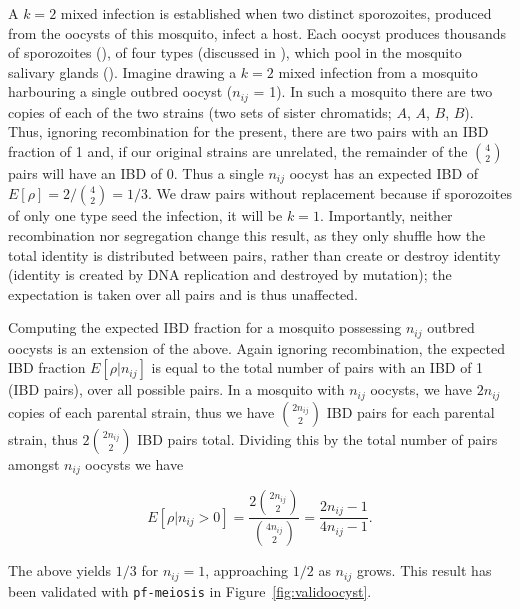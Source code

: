 \documentclass[9pt]{article}
\begin{document}
A $k=2$ mixed infection is established when two distinct sporozoites, produced from the oocysts of this mosquito, infect a host. Each oocyst produces thousands of sporozoites (\citet{Beir1991}), of four types (discussed in \citet{McKenzie2001}), which pool in the mosquito salivary glands (\citet{Gosh2000}). Imagine drawing a $k=2$ mixed infection from a mosquito harbouring a single outbred oocyst ($n_{ij}$ = 1). In such a mosquito there are two copies of each of the two strains (two sets of sister chromatids; $A$, $A$, $B$, $B$). Thus, ignoring recombination for the present, there are two pairs with an IBD fraction of 1 and, if our original strains are unrelated, the remainder of the ${4 \choose 2}$ pairs will have an IBD of 0. Thus a single $n_{ij}$ oocyst has an expected IBD of $E[\rho]= 2/{4 \choose 2} = 1/3$. We draw pairs without replacement because if sporozoites of only one type seed the infection, it will be $k=1$.  Importantly, neither recombination nor segregation change this result, as they only shuffle how the total identity is distributed between pairs, rather than create or destroy identity (identity is created by DNA replication and destroyed by mutation); the expectation is taken over all pairs and is thus unaffected.

Computing the expected IBD fraction for a mosquito possessing $n_{ij}$ outbred oocysts is an extension of the above. Again ignoring recombination, the expected IBD fraction $E[\rho|n_{ij}]$ is equal to the total number of pairs with an IBD of 1 (IBD pairs), over all possible pairs. In a mosquito with $n_{ij}$ oocysts, we have $2n_{ij}$ copies of each parental strain, thus we have ${2n_{ij} \choose 2}$ IBD pairs for each parental strain, thus $2 {2n_{ij} \choose 2}$ IBD pairs total. Dividing this by the total number of pairs amongst $n_{ij}$ oocysts we have

\begin{equation} \label{eq1}
E[\rho|n_{ij} > 0] = \frac{2{2n_{ij} \choose 2}}{{4n_{ij} \choose 2}} = \frac{2n_{ij} - 1}{4n_{ij} - 1}.
\end{equation}

The above yields $1/3$ for $n_{ij}=1$, approaching $1/2$ as $n_{ij}$ grows. This result has been validated with \texttt{pf-meiosis} in Figure~\ref{fig:validoocyst}.
\end{document}
